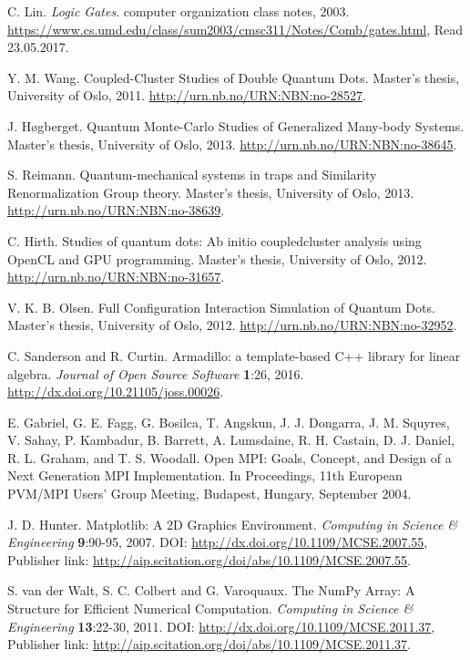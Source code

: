 \documentclass[../main.tex]{subfiles}
\begin{document}
\begin{thebibliography}{99}
 C. Lin. \emph{Logic Gates}. computer organization class notes, 2003. \url{https://www.cs.umd.edu/class/sum2003/cmsc311/Notes/Comb/gates.html}, Read 23.05.2017.

 Y. M. Wang. Coupled-Cluster Studies of Double Quantum
Dots. Master’s thesis, University of Oslo, 2011. \url{http://urn.nb.no/URN:NBN:no-28527}.

 J. Høgberget. Quantum Monte-Carlo Studies of Generalized Many-body Systems. 
Master’s thesis, University of Oslo, 2013. \url{http://urn.nb.no/URN:NBN:no-38645}.

 S. Reimann. Quantum-mechanical systems in traps and Similarity Renormalization Group theory. Master’s thesis, University of Oslo, 2013. \url{http://urn.nb.no/URN:NBN:no-38639}.

 C. Hirth. Studies of quantum dots: Ab initio coupledcluster analysis using OpenCL and GPU programming. Master’s thesis, University of Oslo, 2012. \url{http://urn.nb.no/URN:NBN:no-31657}.

 V. K. B. Olsen. Full Configuration Interaction Simulation of Quantum Dots. Master’s thesis, University of Oslo, 2012. \url{http://urn.nb.no/URN:NBN:no-32952}.

 C. Sanderson and R. Curtin. Armadillo: a template-based C++ library for linear algebra. 
\emph{Journal of Open Source Software} \textbf{1}:26, 2016. \url{http://dx.doi.org/10.21105/joss.00026}.

 E. Gabriel, G. E. Fagg, G. Bosilca, T. Angskun, J. J. Dongarra, J. M. Squyres, V. Sahay, P. Kambadur, B. Barrett, A. Lumsdaine, R. H. Castain, D. J. Daniel, R. L. Graham, and T. S. Woodall. Open MPI: Goals, Concept, and Design of a Next Generation MPI Implementation. In Proceedings, 11th European PVM/MPI Users' Group Meeting, Budapest, Hungary, September 2004.

 J. D. Hunter. Matplotlib: A 2D Graphics Environment. \emph{Computing in Science \& Engineering} \textbf{9}:90-95, 2007. DOI: \url{http://dx.doi.org/10.1109/MCSE.2007.55}, Publisher link: \url{http://aip.scitation.org/doi/abs/10.1109/MCSE.2007.55}.

 S. van der Walt, S. C. Colbert and G. Varoquaux. The NumPy Array: A Structure for Efficient Numerical Computation. \emph{Computing in Science \& Engineering} \textbf{13}:22-30, 2011.  DOI: \url{http://dx.doi.org/10.1109/MCSE.2011.37}, Publisher link: \url{http://aip.scitation.org/doi/abs/10.1109/MCSE.2011.37}.


\end{thebibliography}
\end{document}
